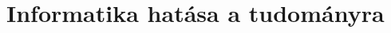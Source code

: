 \documentclass[12pt,a4paper]{article}
\begin{document}






%

%
%
%
%

\section{Informatika hatása a tudományra}
\end{document}
